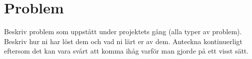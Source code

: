 \section{Problem}
Beskriv problem som uppstått under projektets gång (alla typer av problem). Beskriv hur ni har löst dem och vad ni lärt er av dem. Anteckna kontinuerligt eftersom det kan vara svårt att komma ihåg varför man gjorde på ett visst sätt.

